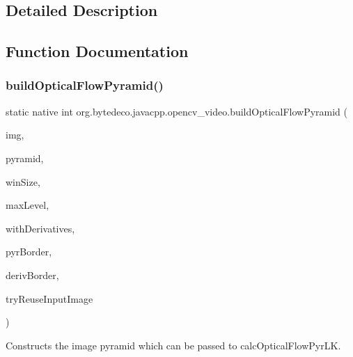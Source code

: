 \subsection{Detailed Description}


\subsection{Function Documentation}
\mbox{\label{group__video__track_gafca5a72a408befa96e624e9d9704303b}} 
\subsubsection{\texorpdfstring{build\+Optical\+Flow\+Pyramid()}{buildOpticalFlowPyramid()}}
{\footnotesize\ttfamily static native int org.\+bytedeco.\+javacpp.\+opencv\+\_\+video.\+build\+Optical\+Flow\+Pyramid (\begin{DoxyParamCaption}\item[{@By\+Val Mat}]{img,  }\item[{@By\+Val Mat\+Vector}]{pyramid,  }\item[{@By\+Val Size}]{win\+Size,  }\item[{int}]{max\+Level,  }\item[{@Cast(\char`\"{}bool\char`\"{}) boolean}]{with\+Derivatives,  }\item[{int}]{pyr\+Border,  }\item[{int}]{deriv\+Border,  }\item[{@Cast(\char`\"{}bool\char`\"{}) boolean}]{try\+Reuse\+Input\+Image }\end{DoxyParamCaption})\hspace{0.3cm}{\ttfamily [static]}}



Constructs the image pyramid which can be passed to calc\+Optical\+Flow\+Pyr\+LK. 


